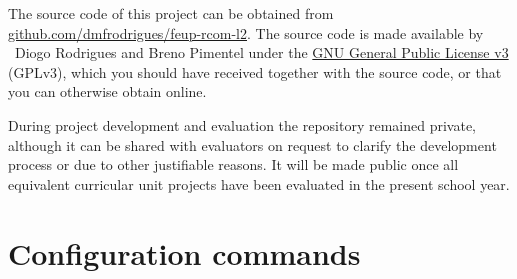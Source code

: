 \documentclass[a4paper, 11pt]{report}
\begin{document}
The source code of this project can be obtained from \href{https://github.com/dmfrodrigues/feup-rcom-l2}{github.com/dmfrodrigues/feup-rcom-l2}.
The source code is made available by \textcopyright~Diogo Rodrigues and Breno Pimentel under the \href{https://www.gnu.org/licenses/gpl-3.0.en.html}{GNU General Public License v3} (GPLv3), which you should have received together with the source code, or that you can otherwise obtain online.

During project development and evaluation the repository remained private, although it can be shared with evaluators on request to clarify the development process or due to other justifiable reasons.
It will be made public once all equivalent curricular unit projects have been evaluated in the present school year.

\fancyhfoffset{0pt}










\restoregeometry

\chapter{Configuration commands}





\end{document}
